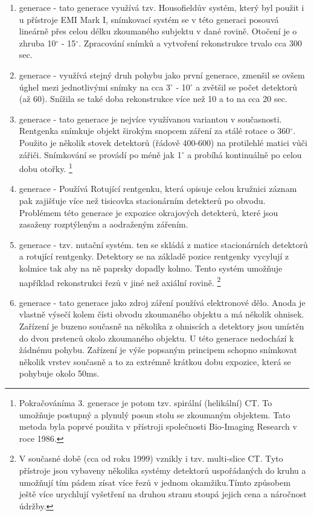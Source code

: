 \documentclass{thesis}%
\begin{document}
\begin{enumerate}
	\item generace - tato generace využívá tzv. Housofieldův systém, který byl použit i u přístroje EMI Mark I, snímkovací systém se v této generaci posouvá lineárně přes celou délku zkoumaného subjektu v dané rovině. Otočení je o zhruba 10$^\circ$ - 15$^\circ$. Zpracování snímků a vytvoření rekonstrukce trvalo cca 300 sec.
	\item generace - využívá stejný druh pohybu jako první generace, zmenšil se ovšem úghel mezi jednotlivými snímky na cca 3$^\circ$ - 10$^\circ$ a zvětšil se počet detektorů (až 60). Snížila se také doba rekonstrukce více než 10 a to na cca 20 sec.
	\item generace - tato generace je nejvíce využívanou variantou v současnosti. Rentgenka snímkuje objekt širokým snopcem záření za stálé rotace o 360$^\circ$. Použito je několik stovek detektorů (řádově 400-600) na protilehlé matici vůči zářiči. Snímkování se provádí po méně jak 1$^\circ$ a probíhá kontinuálně po celou dobu otořky.  \footnote[3]{Pokračováníma 3. generace je potom tzv. spirální (helikální) CT. To umožňuje postupný a plynulý posun stolu se zkoumaným objektem. Tato metoda byla poprvé použita v přístroji společnosti Bio-Imaging Research v roce 1986.}
	\item generace - Používá Rotující rentgenku, která opisuje celou kružnici záznam pak zajišťuje více než tisicovka stacionárním detekterů po obvodu. Problémem této generace je expozice okrajových detekterů, které jsou zasaženy rozptýleným a aodraženým zářením. 
	\item generace - tzv. nutační systém. ten se skládá z matice stacionárních detektorů a rotující rentgenky. Detektory se na základě pozice rentgenky vycylují z kolmice tak aby na ně paprsky dopadly kolmo. Tento systém umožňuje například rekonstrukci řezů v jiné než axiální rovině. \footnote[4]{V současné době (cca od roku 1999) vznikly i tzv. multi-slice CT. Tyto přístroje jsou vybaveny několika systémy detektorů uspořádaných do kruhu a umožňují tím pádem zísat více řezů v jednom okamžiku.Tímto způsobem ještě více urychlují vyšetření na druhou stranu stoupá jejich cena a náročnost údržby.}
	\item generace - tato generace jako zdroj záření používá elektronové dělo. Anoda je vlastně výsečí kolem čísti obvodu zkoumaného objektu a má několik ohnisek. Zařízení je buzeno současně na několika z ohniscích a detektory jsou umístěn do dvou prstenců okolo zkoumaného objektu. U této generace nedochází k žádnému pohybu. Zařízení je výše popsaným principem schopno snímkovat několik vrstev současně a to za extrémně krátkou dobu expozice, která se pohybuje okolo 50ms.
\end{enumerate}
\end{document}
